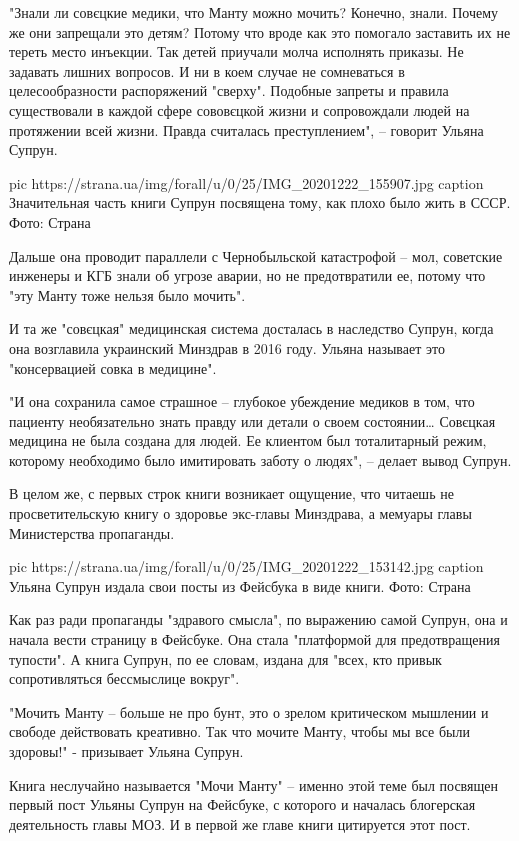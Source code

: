 "Знали ли совєцкие медики, что Манту можно мочить? Конечно, знали. Почему же
они запрещали это детям? Потому что вроде как это помогало заставить их не
тереть место инъекции. Так детей приучали молча исполнять приказы. Не задавать
лишних вопросов. И ни в коем случае не сомневаться в целесообразности
распоряжений "сверху". Подобные запреты и правила существовали в каждой сфере
сововєцкой жизни и сопровождали людей на протяжении всей жизни. Правда
считалась преступлением", – говорит Ульяна Супрун.

\ifcmt
pic https://strana.ua/img/forall/u/0/25/IMG_20201222_155907.jpg
caption Значительная часть книги Супрун посвящена тому, как плохо было жить в СССР. Фото: Страна
\fi

Дальше она проводит параллели с Чернобыльской катастрофой – мол, советские
инженеры и КГБ знали об угрозе аварии, но не предотвратили ее, потому что "эту
Манту тоже нельзя было мочить".
 
И та же "совєцкая" медицинская система досталась в наследство Супрун, когда она
возглавила украинский Минздрав в 2016 году. Ульяна называет это "консервацией
совка в медицине".
 
"И она сохранила самое страшное – глубокое убеждение медиков в том, что
пациенту необязательно знать правду или детали о своем состоянии… Совєцкая
медицина не была создана для людей. Ее клиентом был тоталитарный режим,
которому необходимо было имитировать заботу о людях", – делает вывод Супрун.
 
В целом же, с первых строк книги возникает ощущение, что читаешь не
просветительскую книгу о здоровье экс-главы Минздрава, а мемуары главы
Министерства пропаганды.

\ifcmt
pic https://strana.ua/img/forall/u/0/25/IMG_20201222_153142.jpg
caption Ульяна Супрун издала свои посты из Фейсбука в виде книги. Фото: Страна
\fi

Как раз ради пропаганды "здравого смысла", по выражению самой Супрун, она и
начала вести страницу в Фейсбуке. Она стала "платформой для предотвращения
тупости". А книга Супрун, по ее словам, издана для "всех, кто привык
сопротивляться бессмыслице вокруг".
 
"Мочить Манту – больше не про бунт, это о зрелом критическом мышлении и свободе
действовать креативно. Так что мочите Манту, чтобы мы все были здоровы!" -
призывает Ульяна Супрун.
 
Книга неслучайно называется "Мочи Манту" – именно этой теме был посвящен первый
пост Ульяны Супрун на Фейсбуке, с которого и началась блогерская деятельность
главы МОЗ. И в первой же главе книги цитируется этот пост.
 
